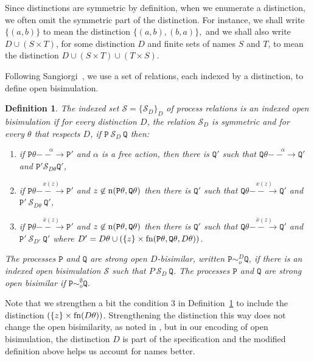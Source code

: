 \documentclass{acmtrans2m}
\newenvironment{definition}{\begin{define} \rm}{\end{define}}
\newtheorem{define}[theorem]{Definition}
\def\Sscr{{\mathcal S}}
\def\Ppi{{\mathtt P}}
\def\Qpi{{\mathtt Q}}
\newcommand{\one  }[3]{#1\stackrel{#2}{-\!\!-\!\!\!\rightarrow    } #3}
\newcommand{\fn}[1]{{\rm fn}(#1)}
\newcommand{\n}[1]{{\rm n}(#1)}
\begin{document}
Since distinctions are symmetric by definition, when we enumerate a
distinction, we often omit the symmetric part of the distinction.  For
instance, we shall write $\{(a,b)\}$ to mean the distinction $\{(a,b),
(b,a)\},$ and we shall also write $D\cup(S \times T)$, for some
distinction $D$ and finite sets of names $S$ and $T$, to mean the
distinction $D\cup (S\times T) \cup (T\times S)$.
 
Following Sangiorgi~\cite{sangiorgi96acta}, we use a set of relations,
each indexed by a distinction, to define open bisimulation.

\begin{definition} 
\label{def:obisim}
The indexed set $\Sscr = \{\Sscr_D \}_D$ of process relations is an
{\em indexed
open bisimulation} if for every distinction $D$, the relation
$\Sscr_D$ is symmetric and for every 
$\theta$ that respects $D$, if $\Ppi ~ \Sscr_D ~ \Qpi$ then:
\begin{enumerate}
\item if $\one{\Ppi\theta}{\alpha}{\Ppi'}$ and $\alpha$ is a free action,
  then there is $\Qpi'$ such that
  $\one{\Qpi\theta}{\alpha}{\Qpi'}$ and $\Ppi' \Sscr_{D\theta} \Qpi'$,
\item if $\one{\Ppi\theta}{x(z)}{\Ppi'}$ and $z \not \in \n{\Ppi\theta,\Qpi\theta}$ 
  then there is $\Qpi'$ such that
  $\one{\Qpi\theta}{x(z)}{\Qpi'}$ and $\Ppi' ~\Sscr_{D\theta} ~ \Qpi'$,
\item \label{def:obisim3} if $\one{\Ppi\theta}{\bar{x}(z)}{\Ppi'}$ and $z \not \in \n{\Ppi\theta,\Qpi\theta}$ 
  then there is $\Qpi'$
  such that $\one{\Qpi\theta}{\bar{x}(z)}{\Qpi'}$ and 
  $\Ppi' ~ \Sscr_{D'} ~ \Qpi'$ where $D' = D\theta \cup 
  (\{z\} \times \fn{\Ppi\theta,\Qpi\theta, D\theta})$.
\end{enumerate}
The processes $\Ppi$ and $\Qpi$ are {\em strong open $D$-bisimilar},
written $\Ppi \sim^D_o \Qpi$, if there is an indexed open bisimulation
$\Sscr$ such that $P~\Sscr_D ~\Qpi$. The processes $\Ppi$ and $\Qpi$ are
{\em strong open bisimilar} if $\Ppi \sim_o^\emptyset  \Qpi.$
\end{definition}

Note that we strengthen a bit the condition 3 in
Definition~\ref{def:obisim} to include the distinction $(\{z\} \times
\fn{D\theta})$.  Strengthening the distinction this way does not change the
open bisimilarity, as noted in \cite{sangiorgi01}, but in our encoding
of open bisimulation, the distinction $D$ is part of the specification
and the modified definition above helps us account for names better.
\end{document}
